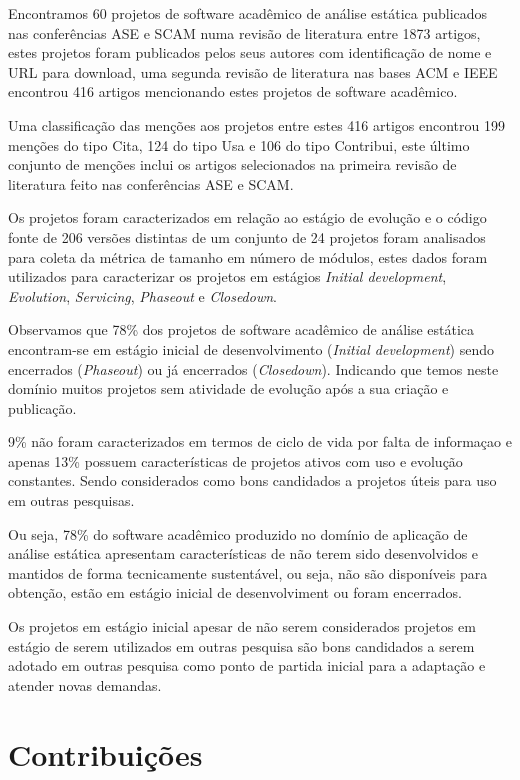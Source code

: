 \label{conclusoes}

Encontramos 60 projetos de software acadêmico de análise estática publicados
nas conferências ASE e SCAM numa revisão de literatura entre 1873 artigos,
estes projetos foram publicados pelos seus autores com identificação de nome e
URL para download, uma segunda revisão de literatura nas bases ACM e IEEE
encontrou 416 artigos mencionando estes projetos de software acadêmico.

Uma classificação das menções aos projetos entre estes 416 artigos encontrou
199 menções do tipo Cita, 124 do tipo Usa e 106 do tipo Contribui, este último
conjunto de menções inclui os artigos selecionados na primeira revisão de literatura
feito nas conferências ASE e SCAM.

Os projetos foram caracterizados em relação ao estágio de evolução e o código
fonte de 206 versões distintas de um conjunto de 24 projetos foram analisados
para coleta da métrica de tamanho em número de módulos, estes dados foram
utilizados para caracterizar os projetos em estágios {\it Initial development},
{\it Evolution}, {\it Servicing}, {\it Phaseout} e {\it Closedown}.

Observamos que 78\% dos projetos de software acadêmico de análise estática
encontram-se em estágio inicial de desenvolvimento ({\it Initial development})
sendo encerrados ({\it Phaseout}) ou já encerrados ({\it Closedown}). Indicando
que temos neste domínio muitos projetos sem atividade de evolução após a sua
criação e publicação.

9\% não foram caracterizados em termos de ciclo de vida por falta de informaçao
e apenas 13\% possuem características de projetos ativos com uso e evolução
constantes. Sendo considerados como bons candidados a projetos úteis para uso
em outras pesquisas.

Ou seja, 78\% do software acadêmico produzido no domínio de aplicação de
análise estática apresentam características de não terem sido desenvolvidos e
mantidos de forma tecnicamente sustentável, ou seja, não são disponíveis para
obtenção, estão em estágio inicial de desenvolviment ou foram encerrados.

Os projetos em estágio inicial apesar de não serem considerados projetos em
estágio de serem utilizados em outras pesquisa são bons candidados a serem
adotado em outras pesquisa como ponto de partida inicial para a adaptação e
atender novas demandas.

\section{Contribuições}


